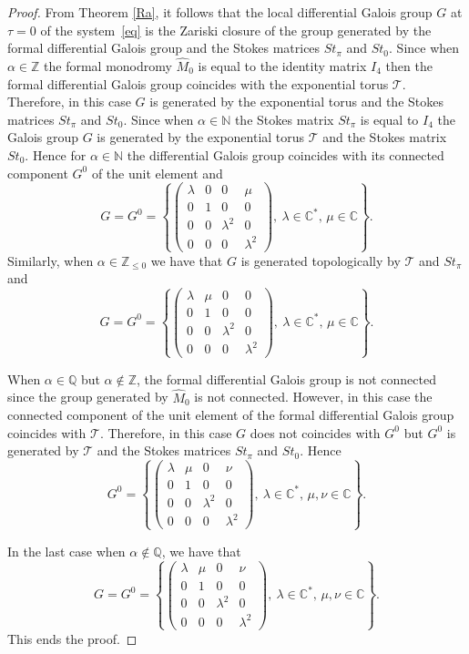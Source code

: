 \documentclass[pdftex]{sigma}
\numberwithin{equation}{section}
\begin{document}
 \begin{proof}
 From Theorem \ref{Ra}, it follows that the local differential Galois group $G$ at $\tau=0$ of the system~\eqref{eq}
 is the Zariski closure of the group generated by the formal differential Galois group
 and the Stokes matrices $St_{\pi}$ and $St_0$. Since when $\alpha\in\mathbb{Z}$ the formal monodromy $\hat{M}_0$ is equal
 to the identity matrix $I_4$ then the formal differential Galois group coincides with the exponential torus $\mathcal{T}$.
 Therefore, in this case $G$ is generated by the exponential torus and the
 Stokes matrices $St_{\pi}$ and $St_0$. Since when $\alpha\in\mathbb{N}$ the Stokes matrix $St_{\pi}$ is equal to $I_4$ the
 Galois group $G$ is generated by the exponential torus $\mathcal{T}$ and the Stokes matrix $St_0$. Hence for $\alpha\in\mathbb{N}$
 the differential Galois group coincides with its connected component $G^0$ of the unit element and
 \[
 G=G^0=\left\{\begin{pmatrix}
 \lambda & 0 & 0 & \mu\\
 0 & 1 & 0 & 0\\
 0 & 0 & \lambda^2 & 0\\
 0 & 0 & 0 & \lambda^2
 \end{pmatrix}, \ \lambda\in\mathbb{C}^*,\, \mu\in\mathbb{C}\right\} .
 \]
Similarly, when $\alpha\in\mathbb{Z}_{\leq 0}$ we have that $G$
 is generated topologically by $\mathcal{T}$ and $St_{\pi}$ and
 \[
 G=G^0=\left\{\begin{pmatrix}
 \lambda & \mu & 0 & 0\\
 0 & 1 & 0 & 0\\
 0 & 0 & \lambda^2 & 0\\
 0 & 0 & 0 & \lambda^2
 \end{pmatrix}, \ \lambda\in\mathbb{C}^*,\, \mu\in\mathbb{C}\right\} .
 \]

 When $\alpha\in\mathbb{Q}$ but $\alpha\notin\mathbb{Z}$, the formal differential Galois group is not connected since the group generated
 by $\hat{M}_0$ is not connected. However, in this case the connected component of the unit element of the formal differential
 Galois group coincides with $\mathcal{T}$. Therefore, in this case $G$ does not coincides with $G^0$ but $G^0$ is generated by $\mathcal{T}$ and
 the Stokes matrices $St_{\pi}$ and $St_0$. Hence
 \[
 G^0=\left\{\begin{pmatrix}
 \lambda & \mu & 0 & \nu\\
 0 & 1 & 0 & 0\\
 0 & 0 & \lambda^2 & 0\\
 0 & 0 & 0 & \lambda^2
 \end{pmatrix}, \ \lambda\in\mathbb{C}^*,\, \mu, \nu\in\mathbb{C}\right\} .
 \]

 In the last case when $\alpha\notin\mathbb{Q}$, we have that
 \[
 G=G^0=\left\{\begin{pmatrix}
 \lambda & \mu & 0 & \nu\\
 0 & 1 & 0 & 0\\
 0 & 0 & \lambda^2 & 0\\
 0 & 0 & 0 & \lambda^2
 \end{pmatrix}, \ \lambda\in\mathbb{C}^*,\, \mu, \nu\in\mathbb{C}\right\} .
 \]
 This ends the proof.
 \end{proof}
\end{document}
